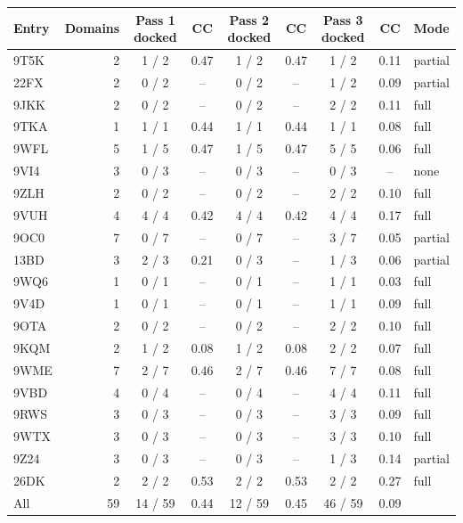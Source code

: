 \begin{tabular}{lrccccccl}
\toprule
Entry & Domains & Pass 1 docked & CC & Pass 2 docked & CC & Pass 3 docked & CC & Mode \\
\midrule
9T5K & 2 & 1 / 2 & 0.47 & 1 / 2 & 0.47 & 1 / 2 & 0.11 & partial \\
22FX & 2 & 0 / 2 & -- & 0 / 2 & -- & 1 / 2 & 0.09 & partial \\
9JKK & 2 & 0 / 2 & -- & 0 / 2 & -- & 2 / 2 & 0.11 & full \\
9TKA & 1 & 1 / 1 & 0.44 & 1 / 1 & 0.44 & 1 / 1 & 0.08 & full \\
9WFL & 5 & 1 / 5 & 0.47 & 1 / 5 & 0.47 & 5 / 5 & 0.06 & full \\
9VI4 & 3 & 0 / 3 & -- & 0 / 3 & -- & 0 / 3 & -- & none \\
9ZLH & 2 & 0 / 2 & -- & 0 / 2 & -- & 2 / 2 & 0.10 & full \\
9VUH & 4 & 4 / 4 & 0.42 & 4 / 4 & 0.42 & 4 / 4 & 0.17 & full \\
9OC0 & 7 & 0 / 7 & -- & 0 / 7 & -- & 3 / 7 & 0.05 & partial \\
13BD & 3 & 2 / 3 & 0.21 & 0 / 3 & -- & 1 / 3 & 0.06 & partial \\
9WQ6 & 1 & 0 / 1 & -- & 0 / 1 & -- & 1 / 1 & 0.03 & full \\
9V4D & 1 & 0 / 1 & -- & 0 / 1 & -- & 1 / 1 & 0.09 & full \\
9OTA & 2 & 0 / 2 & -- & 0 / 2 & -- & 2 / 2 & 0.10 & full \\
9KQM & 2 & 1 / 2 & 0.08 & 1 / 2 & 0.08 & 2 / 2 & 0.07 & full \\
9WME & 7 & 2 / 7 & 0.46 & 2 / 7 & 0.46 & 7 / 7 & 0.08 & full \\
9VBD & 4 & 0 / 4 & -- & 0 / 4 & -- & 4 / 4 & 0.11 & full \\
9RWS & 3 & 0 / 3 & -- & 0 / 3 & -- & 3 / 3 & 0.09 & full \\
9WTX & 3 & 0 / 3 & -- & 0 / 3 & -- & 3 / 3 & 0.10 & full \\
9Z24 & 3 & 0 / 3 & -- & 0 / 3 & -- & 1 / 3 & 0.14 & partial \\
26DK & 2 & 2 / 2 & 0.53 & 2 / 2 & 0.53 & 2 / 2 & 0.27 & full \\
\midrule
All & 59 & 14 / 59 & 0.44 & 12 / 59 & 0.45 & 46 / 59 & 0.09 &  \\
\bottomrule
\end{tabular}
